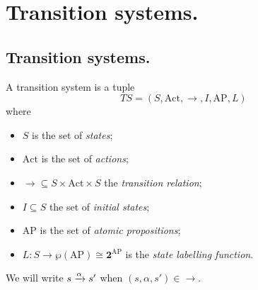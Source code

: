 \documentclass[./main]{subfiles}
\begin{document}
  \chapter{Transition systems.}

  \section{Transition systems.}

  \begin{defn}
    A transition system is a tuple
    \[
      TS = (S, \mathrm{Act}, {\to}, I, \mathrm{AP}, L)
    \] 
    where
    \begin{itemize}
      \item $S$ is the set of \textit{states};
      \item $\mathrm{Act}$ is the set of \textit{actions};
      \item ${\to} \subseteq S \times \mathrm{Act} \times S$ the \textit{transition relation};
      \item $I \subseteq S$ the set of \textit{initial states};
      \item $\mathrm{AP}$ is the set of \textit{atomic propositions};
      \item $L : S \to \wp(\mathrm{AP}) \cong \mathbf{2}^{\mathrm{AP}}$ is the \textit{state labelling function}.
    \end{itemize}
    We will write $s \mathrel{\xrightarrow{\alpha}} s'$ when $(s, \alpha, s') \in {\to}$.
  \end{defn}
\end{document}
